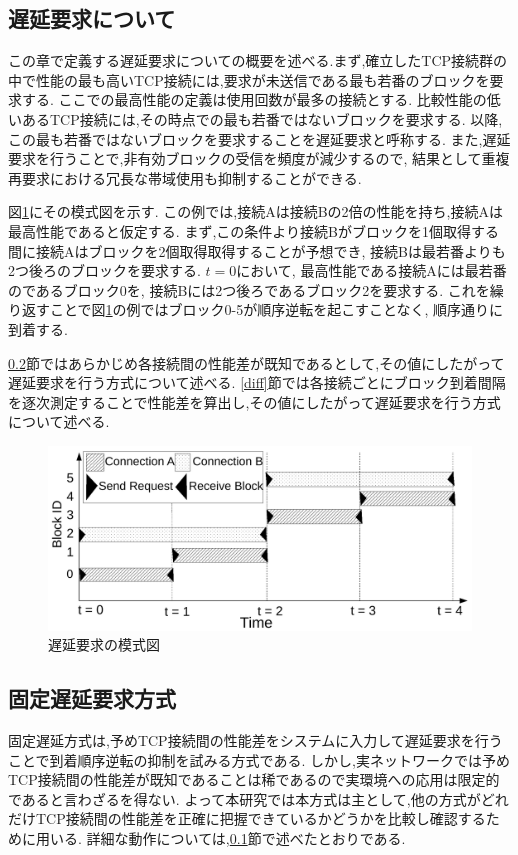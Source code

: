 \documentclass[a4j,12pt]{gradthesis_utf8}
\begin{document}
\newpage

\subsection{遅延要求について}
\label{chienyokyu}
この章で定義する遅延要求についての概要を述べる.まず,確立したTCP接続群の中で性能の最も高いTCP接続には,要求が未送信である最も若番のブロックを要求する.
ここでの最高性能の定義は使用回数が最多の接続とする.
比較性能の低いあるTCP接続には,その時点での最も若番ではないブロックを要求する.
以降,この最も若番ではないブロックを要求することを遅延要求と呼称する.
また,遅延要求を行うことで,非有効ブロックの受信を頻度が減少するので,
結果として重複再要求における冗長な帯域使用も抑制することができる.

図\ref{delay}にその模式図を示す.
この例では,接続Aは接続Bの2倍の性能を持ち,接続Aは最高性能であると仮定する.
まず,この条件より接続Bがブロックを1個取得する間に接続Aはブロックを2個取得取得することが予想でき,
接続Bは最若番よりも2つ後ろのブロックを要求する.
\begin{math}t=0\end{math}において,
最高性能である接続Aには最若番のであるブロック0を,
接続Bには2つ後ろであるブロック2を要求する.
これを繰り返すことで図\ref{delay}の例ではブロック0-5が順序逆転を起こすことなく,
順序通りに到着する.

\ref{kotei}節ではあらかじめ各接続間の性能差が既知であるとして,その値にしたがって遅延要求を行う方式について述べる.
\ref{diff}節では各接続ごとにブロック到着間隔を逐次測定することで性能差を算出し,その値にしたがって遅延要求を行う方式について述べる.

\begin{figure}[ht]
    \centering
    \includegraphics[width=16.25cm]{figure/delay-n.pdf}
    \caption{遅延要求の模式図}
    \label{delay}
\end{figure}

\subsection{固定遅延要求方式}
\label{kotei}
固定遅延方式は,予めTCP接続間の性能差をシステムに入力して遅延要求を行うことで到着順序逆転の抑制を試みる方式である.
しかし,実ネットワークでは予めTCP接続間の性能差が既知であることは稀であるので実環境への応用は限定的であると言わざるを得ない.
よって本研究では本方式は主として,他の方式がどれだけTCP接続間の性能差を正確に把握できているかどうかを比較し確認するために用いる.
詳細な動作については,\ref{chienyokyu}節で述べたとおりである.
\end{document}

